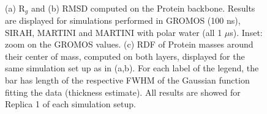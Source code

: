 \begin{figure}[p!]
\centering
{} 
 \\
\caption[Structural measures on buckyball in solution]{(a) R$_g$ and (b) RMSD computed on the Protein backbone. Results are displayed for simulations performed in GROMOS (100 ns), SIRAH, MARTINI and MARTINI with polar water (all 1 $\mu$s). Inset: zoom on the GROMOS values. (c) RDF of Protein masses around their center of mass, computed on both layers, displayed for the same simulation set up as in (a,b). For each label of the legend, the bar has length of the respective FWHM of the Gaussian function fitting the data (thickness estimate). All results are showed for Replica 1 of each simulation setup.}
\label{fig:struct_UA_SIhere}
\end{figure}
%
